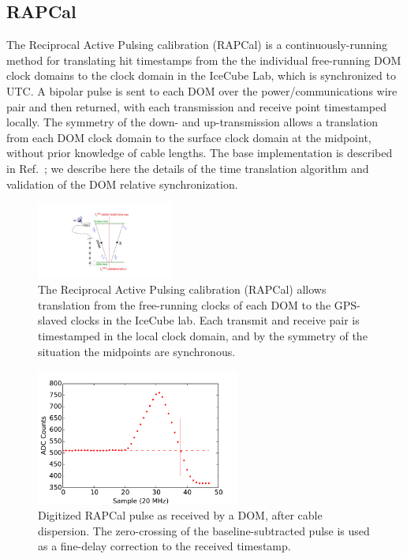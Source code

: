 \subsection{\label{sect:dom:rapcal}RAPCal}

The Reciprocal Active Pulsing calibration (RAPCal) is a
continuously-running method for translating hit timestamps from the the
individual free-running DOM clock domains to the clock domain in the
IceCube Lab, which is synchronized to UTC.  A bipolar pulse is sent to each
DOM over the power/communications wire pair and then returned, with each
transmission and receive point timestamped locally.  The symmetry of the down-
and up-transmission allows a translation from each DOM clock domain to the
surface clock domain at the midpoint, without prior knowledge of cable lengths.
The base implementation is described in Ref.~\cite{ICECUBE:DAQ}; we
describe here the details of the time translation algorithm and validation
of the DOM relative synchronization. 

\begin{figure}[!h]
 \centering
 \includegraphics[width=0.4\textwidth]{graphics/dom/rapcal/rapcal_symmetry.pdf}
 \caption{The Reciprocal Active Pulsing calibration (RAPCal) allows
   translation from the free-running clocks of each DOM to the GPS-slaved
   clocks in the IceCube lab.  Each transmit and receive pair is
   timestamped in the local clock domain, and by the symmetry of the
   situation the midpoints are synchronous.}
 \label{fig:rapcal_symmetry}
\end{figure}

\begin{figure}[h]
 \centering
 \includegraphics[width=0.6\textwidth]{graphics/dom/rapcal/dom_wf_zero_crossing.pdf}
 \caption{Digitized RAPCal pulse as received by a DOM, after cable dispersion.  The
   zero-crossing of the baseline-subtracted pulse is used as a fine-delay
   correction to the received timestamp.}
 \label{fig:rapcal_zero_crossing}
\end{figure}

